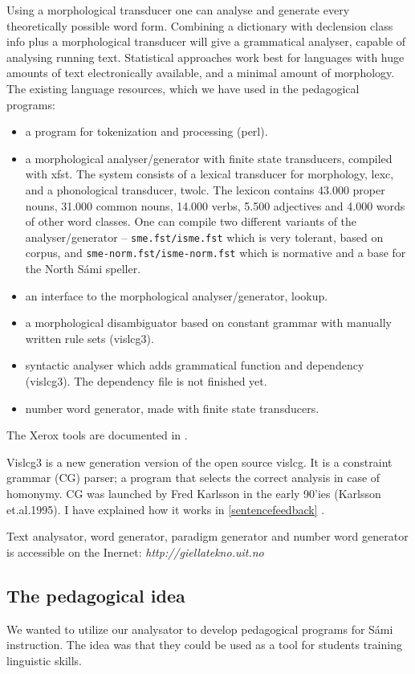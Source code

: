 \documentclass[a4paper,12pt]{article}
\begin{document}
Using a morphological transducer one can analyse and generate every theoretically possible word form. Combining a dictionary with declension class info plus a morphological transducer will give a grammatical analyser, capable of analysing running text. Statistical approaches work best for languages with huge amounts of text electronically available, and a minimal amount of morphology. 
\citep{TT07}
\newpage
The existing language resources, which we have used in the pedagogical programs:
\begin{itemize}
\item a program for tokenization and processing (perl).
\item a morphological analyser/generator with finite state transducers, compiled with xfst. The system consists of a lexical transducer for morphology, lexc, and a phonological transducer, twolc. The lexicon contains 43.000 proper nouns, 31.000 common nouns, 14.000 verbs, 5.500 adjectives and 4.000 words of other word classes. One can compile two different variants of the analyser/generator -- \texttt{sme.fst/isme.fst} which is very tolerant, based on corpus, and \texttt{sme-norm.fst/isme-norm.fst} which is normative and a base for the North Sámi speller.  
\item an interface to the morphological analyser/generator, lookup. 
\item a morphological disambiguator based on constant grammar with manually written rule sets (vislcg3). 
\item syntactic analyser which adds grammatical function and dependency (vislcg3). The dependency file is not finished yet.
\item number word generator, made with finite state transducers.
\end{itemize}

The Xerox tools are documented in \citep{BeesleyKarttunen}. 

Vislcg3 is a new generation version of the open source vislcg. It is a constraint grammar (CG) parser; a program that selects the correct analysis in case of homonymy. CG was launched by Fred Karlsson in the early 90'ies (Karlsson et.al.1995). I have explained how it works in \ref{sentencefeedback}
.

Text analysator, word generator, paradigm generator and number word generator is accessible on the Inernet: \textit{http://giellatekno.uit.no}

\subsection{The pedagogical idea}
We wanted to utilize our analysator to develop pedagogical programs for Sámi instruction. The idea was that they could be used as a tool for students training linguistic skills. 
\end{document}
